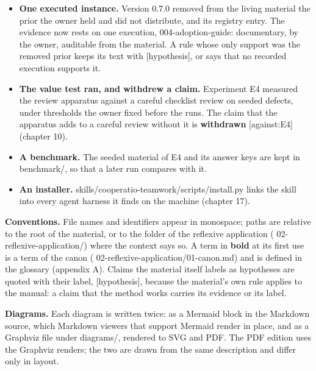 \documentclass[
  american,
  10pt,
]{report}
\providecommand{\tightlist}{%
  \setlength{\itemsep}{0pt}\setlength{\parskip}{0pt}}
\renewcommand{\texttt}[1]{{\ttfamily\hyphenchar\font=-1 #1}}
\begin{document}
\begin{itemize}
\tightlist
\item
  \textbf{One executed instance.} Version 0.7.0 removed from the living
  material the prior the owner held and did not distribute, and its
  registry entry. The evidence now rests on one execution,
  \texttt{004-\allowbreak{}adoption-\allowbreak{}guide}: documentary, by
  the owner, auditable from the material. A rule whose only support was
  the removed prior keeps its text with \texttt{[hypothesis]}, or says
  that no recorded execution supports it.
\item
  \textbf{The value test ran, and withdrew a claim.} Experiment E4
  measured the review apparatus against a careful checklist review on
  seeded defects, under thresholds the owner fixed before the runs. The
  claim that the apparatus adds to a careful review without it is
  \textbf{withdrawn} \texttt{[against:\allowbreak{}E4]} (chapter 10).
\item
  \textbf{A benchmark.} The seeded material of E4 and its answer keys
  are kept in \texttt{benchmark/\allowbreak{}}, so that a later run
  compares with it.
\item
  \textbf{An installer.}
  \texttt{skills/\allowbreak{}cooperatio-\allowbreak{}teamwork/\allowbreak{}scripts/\allowbreak{}install.\allowbreak{}py}
  links the skill into every agent harness it finds on the machine
  (chapter 17).
\end{itemize}

\textbf{Conventions.} File names and identifiers appear in
\texttt{monospace}; paths are relative to the root of the material, or
to the folder of the reflexive application
(\texttt{02-\allowbreak{}reflexive-\allowbreak{}application/\allowbreak{}})
where the context says so. A term in \textbf{bold} at its first use is a
term of the canon
(\texttt{02-\allowbreak{}reflexive-\allowbreak{}application/\allowbreak{}01-\allowbreak{}canon.\allowbreak{}md})
and is defined in the glossary (appendix A). Claims the material itself
labels as hypotheses are quoted with their label, \texttt{[hypothesis]},
because the material's own rule applies to the manual: a claim that the
method works carries its evidence or its label.

\textbf{Diagrams.} Each diagram is written twice: as a Mermaid block in
the Markdown source, which Markdown viewers that support Mermaid render
in place, and as a Graphviz file under \texttt{diagrams/\allowbreak{}},
rendered to SVG and PDF. The PDF edition uses the Graphviz renders; the
two are drawn from the same description and differ only in layout.
\end{document}
